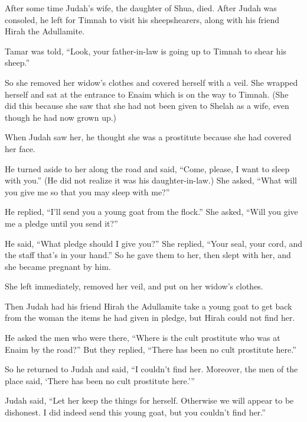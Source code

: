\begin{scripture}
 After some time Judah's wife, the daughter of Shua, died. After Judah was consoled, he left for Timnah to visit his sheepshearers, along with his friend Hirah the Adullamite.
 Tamar was told, ``Look, your father-in-law is going up to Timnah to shear his sheep.''
 So she removed her widow's clothes and covered herself with a veil. She wrapped herself and sat at the entrance to Enaim which is on the way to Timnah. (She did this because she saw that she had not been given to Shelah as a wife, even though he had now grown up.)
\everypar{}

 When Judah saw her, he thought she was a prostitute because she had covered her face.
 He turned aside to her along the road and said, ``Come, please, I want to sleep with you.'' (He did not realize it was his daughter-in-law.) She asked, ``What will you give me so that you may sleep with me?''
 He replied, ``I'll send you a young goat from the flock.'' She asked, ``Will you give me a pledge until you send it?''
 He said, ``What pledge should I give you?'' She replied, ``Your seal, your cord, and the staff that's in your hand.'' So he gave them to her, then slept with her, and she became pregnant by him.
 She left immediately, removed her veil, and put on her widow's clothes.
\everypar{}

 Then Judah had his friend Hirah the Adullamite take a young goat to get back from the woman the items he had given in pledge, but Hirah could not find her.
 He asked the men who were there, ``Where is the cult prostitute who was at Enaim by the road?'' But they replied, ``There has been no cult prostitute here.''
 So he returned to Judah and said, ``I couldn't find her. Moreover, the men of the place said, `There has been no cult prostitute here.'''
 Judah said, ``Let her keep the things for herself. Otherwise we will appear to be dishonest. I did indeed send this young goat, but you couldn't find her.''
\everypar{}


\end{scripture}
